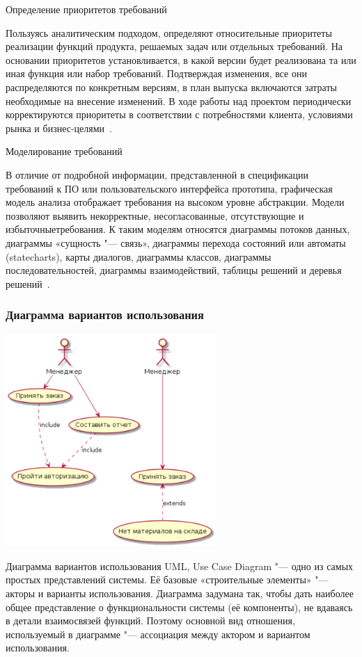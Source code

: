 \documentclass{../industrial-development}
\begin{document}
\alert{Определение приоритетов требований}

Пользуясь аналитическим подходом, определяют относительные приоритеты реализации функций продукта, решаемых задач или отдельных требований. На основании приоритетов установливается, в какой версии будет реализована та или иная функция или набор требований. Подтверждая изменения, все они распределяются по конкретным версиям, в план выпуска включаются затраты необходимые на внесение изменений. В ходе работы над проектом периодически корректируются приоритеты в соответствии с потребностями клиента, условиями рынка и бизнес-целями~\cite[с.~48--49]{Wiegers}.

\alert{Моделирование требований}

В отличие от подробной информации, представленной в спецификации требований к ПО или пользовательского интерфейса прототипа, графическая модель анализа отображает требования на высоком уровне абстракции. Модели позволяют выявить некорректные, несогласованные, отсутствующие и избыточныетребования. К таким моделям относятся диаграммы потоков данных, диаграммы «сущность "--- связь», диаграммы перехода состояний или автоматы (statecharts), карты диалогов, диаграммы классов, диаграммы последовательностей, диаграммы взаимодействий, таблицы решений и деревья решений~\cite[с.~49]{Wiegers}.


\begin{frame} \frametitle {Диаграмма вариантов использования}
 \centerline{\includegraphics[width=0.6\textwidth]{pictusecased.pdf}}
\end{frame}

\lecturenotes

\alert{Диаграмма вариантов использования UML, Use Case Diagram} "--- одно из самых простых представлений системы. Её базовые «строительные элементы» "--- акторы и варианты использования. Диаграмма задумана так, чтобы дать наиболее общее представление о функциональности системы (её компоненты), не вдаваясь в детали взаимосвязей функций. Поэтому основной вид отношения, используемый в диаграмме "--- ассоциация между актором и вариантом использования.
\end{document}
